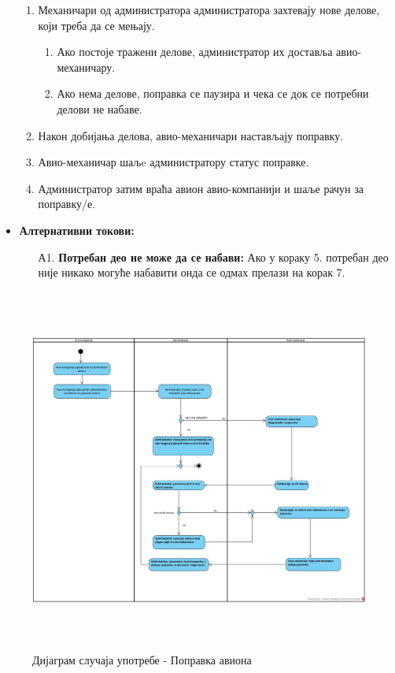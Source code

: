\documentclass{article}
\begin{document}
\begin{itemize}
\begin{enumerate}
            \item Механичари од администратора администратора захтевају нове делове, који треба да се мењају.
                \begin{enumerate}
                    \item Ако постоје тражени делове, администратор их доставља авио-механичару.
                    \item Ако нема делове, поправка се паузира и чека се док се потребни делови не набаве.
                \end{enumerate}
            \item Након добијања делова, авио-механичари настављају поправку.
            \item Авио-механичар шаљe администратору статус поправке.
            \item Администратор затим враћа авион авио-компанији и шаље рачун за поправку/е.
        \end{enumerate}
        
        \item \textbf{Алтернативни токови:}
            \begin{itemize}
                \item[А1.] \textbf{Потребан део не може да се набави:} Ако у кораку 5. потребан део није никако могуће набавити онда се одмах прелази на корак 7.
            \end{itemize}
\end{itemize}

\begin{figure}[H]
    \begin{center}
        \includegraphics[width=1.1\textwidth, height=12cm]{Dijagrami_slike/popravka_aviona.jpg}
        \caption{Дијаграм случаја употребе - Поправка авиона}
    \end{center}
\end{figure}
\end{document}
